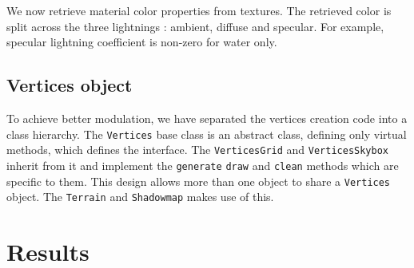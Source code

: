 \documentclass[a4paper,11pt]{article}
\begin{document}
We now retrieve material color properties from textures. The retrieved color is split across the three lightnings : ambient, diffuse and specular. For example, specular lightning coefficient is non-zero for water only.

\subsection{Vertices object}

To achieve better modulation, we have separated the vertices creation code into a class hierarchy. The \texttt{Vertices} base class is an abstract class, defining only virtual methods, which defines the interface. The \texttt{VerticesGrid} and \texttt{VerticesSkybox} inherit from it and implement the \texttt{generate} \texttt{draw} and \texttt{clean} methods which are specific to them. This design allows more than one  object to share a \texttt{Vertices} object. The \texttt{Terrain} and \texttt{Shadowmap} makes use of this.

\section{Results}
\end{document}
